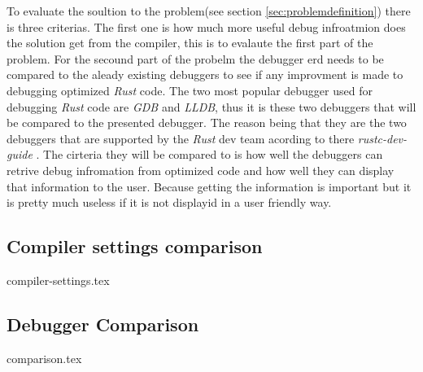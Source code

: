 

To evaluate the soultion to the problem(see section \ref{sec:problemdefinition}) there is three criterias.
The first one is how much more useful debug infroatmion does the solution get from the compiler, this is to evalaute the first part of the problem. 
For the secound part of the probelm the debugger \gls{erd} needs to be compared to the aleady existing debuggers to see if any improvment is made to debugging optimized \emph{Rust} code.
The two most popular debugger used for debugging \emph{Rust} code are \emph{GDB} and \emph{LLDB}, thus it is these two debuggers that will be compared to the presented debugger.
The reason being that they are the two debuggers that are supported by the \emph{Rust} dev team acording to there \emph{rustc-dev-guide} \cite{rust-dev-guide}.
The cirteria they will be compared to is how well the debuggers can retrive debug infromation from optimized code and how well they can display that information to the user.
Because getting the information is important but it is pretty much useless if it is not displayid in a user friendly way.


\subsection{Compiler settings comparison}
\label{sec:settingscomparison}
{compiler-settings.tex}


\subsection{Debugger Comparison}
\label{sec:debuggercomparison}
{comparison.tex}

